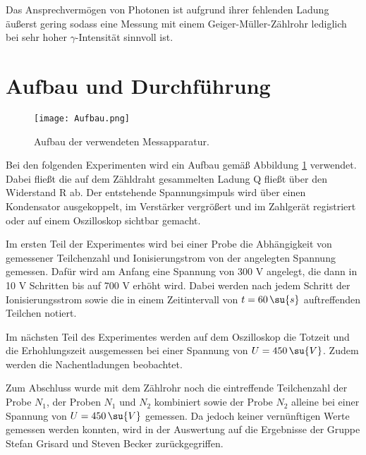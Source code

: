 Das Ansprechvermögen von Photonen ist aufgrund ihrer fehlenden Ladung äußerst
gering sodass eine Messung mit einem Geiger-Müller-Zählrohr lediglich bei
sehr hoher $\gamma$-Intensität sinnvoll ist.

\newpage

\section{Aufbau und Durchführung}

\begin{figure}
  \centering
  \texttt{[image: Aufbau.png]}
  \caption{Aufbau der verwendeten Messapparatur.}
  \label{fig:Aufbau}
\end{figure}

Bei den folgenden Experimenten wird ein Aufbau gemäß Abbildung \ref{fig:Aufbau}
verwendet. Dabei fließt die auf dem Zähldraht gesammelten Ladung Q fließt über
den Widerstand R ab. Der entstehende Spannungsimpuls wird über einen Kondensator
ausgekoppelt, im Verstärker vergrößert und im Zahlgerät registriert oder auf einem
Oszilloskop sichtbar gemacht.

Im ersten Teil der Experimentes wird bei einer Probe die Abhängigkeit von gemessener
Teilchenzahl und Ionisierungstrom von der angelegten Spannung gemessen. Dafür wird
am Anfang eine Spannung von 300 V angelegt, die dann in 10 V Schritten bis auf 700 V
erhöht wird. Dabei werden nach jedem Schritt der Ionisierungsstrom sowie die in einem
Zeitintervall von $t=60 \, \su{s}$ auftreffenden Teilchen notiert.

Im nächsten Teil des Experimentes werden auf dem Oszilloskop die Totzeit und die
Erhohlungszeit ausgemessen bei einer Spannung von $U = 450 \, \su{V}$. Zudem werden
die Nachentladungen beobachtet.

Zum Abschluss wurde mit dem Zählrohr noch die eintreffende Teilchenzahl der
Probe $N_1$, der Proben $N_1$ und $N_2$ kombiniert sowie der Probe $N_2$ alleine
bei einer Spannung von $U = 450 \, \su{V}$ gemessen. Da jedoch keiner vernünftigen
Werte gemessen werden konnten, wird in der Auswertung auf die Ergebnisse der
Gruppe Stefan Grisard und Steven Becker zurückgegriffen.


